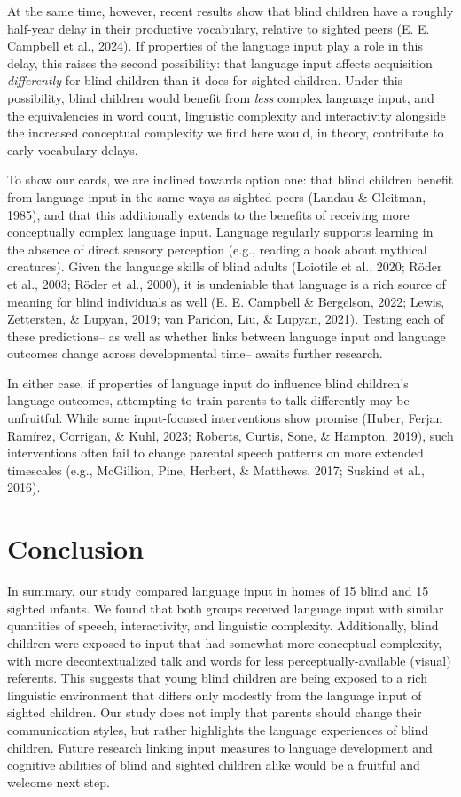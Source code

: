 \documentclass[
  man,floatsintext]{apa6}
\begin{document}
At the same time, however, recent results show that blind children have a roughly half-year delay in their productive vocabulary, relative to sighted peers (E. E. Campbell et al., 2024). If properties of the language input play a role in this delay, this raises the second possibility: that language input affects acquisition \emph{differently} for blind children than it does for sighted children. Under this possibility, blind children would benefit from \emph{less} complex language input, and the equivalencies in word count, linguistic complexity and interactivity alongside the increased conceptual complexity we find here would, in theory, contribute to early vocabulary delays.

To show our cards, we are inclined towards option one: that blind children benefit from language input in the same ways as sighted peers (Landau \& Gleitman, 1985), and that this additionally extends to the benefits of receiving more conceptually complex language input. Language regularly supports learning in the absence of direct sensory perception (e.g., reading a book about mythical creatures). Given the language skills of blind adults (Loiotile et al., 2020; Röder et al., 2003; Röder et al., 2000), it is undeniable that language is a rich source of meaning for blind individuals as well (E. E. Campbell \& Bergelson, 2022; Lewis, Zettersten, \& Lupyan, 2019; van Paridon, Liu, \& Lupyan, 2021). Testing each of these predictions-- as well as whether links between language input and language outcomes change across developmental time-- awaits further research.

In either case, if properties of language input do influence blind children's language outcomes, attempting to train parents to talk differently may be unfruitful. While some input-focused interventions show promise (Huber, Ferjan Ramírez, Corrigan, \& Kuhl, 2023; Roberts, Curtis, Sone, \& Hampton, 2019), such interventions often fail to change parental speech patterns on more extended timescales (e.g., McGillion, Pine, Herbert, \& Matthews, 2017; Suskind et al., 2016).

\hypertarget{conclusion}{%
\section{Conclusion}\label{conclusion}}

In summary, our study compared language input in homes of 15 blind and 15 sighted infants. We found that both groups received language input with similar quantities of speech, interactivity, and linguistic complexity. Additionally, blind children were exposed to input that had somewhat more conceptual complexity, with more decontextualized talk and words for less perceptually-available (visual) referents. This suggests that young blind children are being exposed to a rich linguistic environment that differs only modestly from the language input of sighted children. Our study does not imply that parents should change their communication styles, but rather highlights the language experiences of blind children. Future research linking input measures to language development and cognitive abilities of blind and sighted children alike would be a fruitful and welcome next step.
\end{document}
